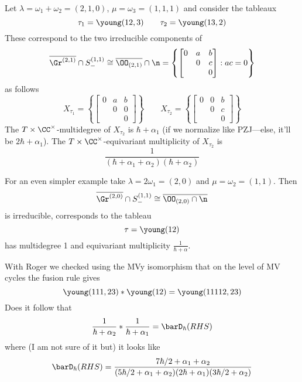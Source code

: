 
\begin{example}[$G = \SL_3$ or $\PGL_3$]
% 
Let $\lambda = \omega_1 + \omega_2 = (2,1,0)$, $\mu = \omega_3 = (1,1,1)$ and consider the tableaux 
$$\tau_1 = \young(12,3)\qquad \tau_2 = \young(13,2)$$
These correspond to the two irreducible components of
$$\overline{\Gr^{(2,1)}}\cap S^{(1,1)}_-\cong \overline{\OO_{(2,1)}}\cap\n
    = \left\{\begin{bmatrix}
    0 & a & b \\
        & 0 & c \\
        &   & 0 
\end{bmatrix} : ac = 0 \right\} $$
as follows
$$
X_{\tau_1} = \left\{\begin{bmatrix}
    0 & a & b \\
        & 0 & 0 \\
        &   & 0 
\end{bmatrix}\right\} \qquad
X_{\tau_2} = \left\{\begin{bmatrix}
    0 & 0 & b \\
        & 0 & c \\
        &   & 0 
\end{bmatrix}\right\}
$$
The $T\times\CC^\times$-multidegree of $X_{\tau_2}$ is $\hbar + \alpha_1$ (if we normalize like PZJ---else, it'll be $2\hbar + \alpha_1$). The $T\times\CC^\times$-equivariant multiplicity of $X_{\tau_2}$ is 
$$\frac 1{(\hbar + \alpha_1 + \alpha_2)(\hbar + \alpha_2)}$$
\end{example}
% 
\begin{example}[$G = \SL_2$ or $\PGL_2$]
    For an even simpler example take $\lambda = 2\omega_1 = (2,0)$ and $\mu = \omega_2 = (1,1)$. Then 
    $$\overline{\Gr^{(2,0)}}\cap S^{(1,1)}_-\cong \overline{\OO_{(2,0)}\cap\n}$$
    is irreducible, corresponds to the tableau 
    $$\tau = \young(12)$$
    has multidegree 1 and equivariant multiplicity $\frac 1 {\hbar + \alpha}$.  
\end{example}
% 
\begin{example}
    With Roger we checked using the MVy isomorphism that on the level of MV cycles the fusion rule gives    
    $$
    \young(111,23) \ast \young(12) = \young(11112,23)
    $$
    Does it follow that 
    $$
    \frac 1 {\hbar +\alpha_2} \ast \frac 1 {\hbar +\alpha_1 } = \barD_\hbar (RHS)
    $$
    where (I am not sure of it but) it looks like 
    $$
    \barD_\hbar (RHS) = \frac{7\hbar/2 + \alpha_1 + \alpha_2}{(5\hbar/2 + \alpha_1 + \alpha_2)(2\hbar + \alpha_1)(3\hbar/2 + \alpha_2)}
    $$
\end{example}
